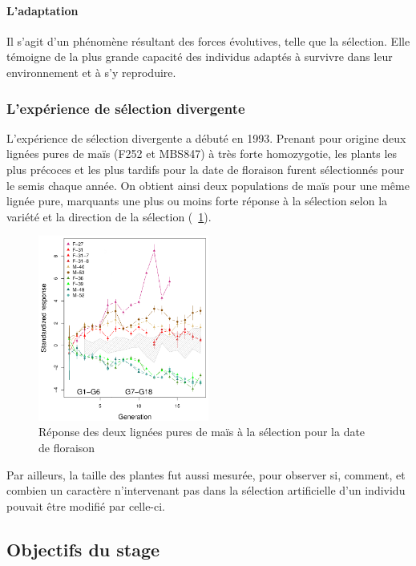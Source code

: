 \documentclass[12pt,a4paper]{article}
\begin{document}
						\paragraph{L'adaptation}
							Il s'agit d'un phénomène résultant des forces évolutives, telle que la sélection. Elle témoigne de la plus grande capacité des individus adaptés à survivre dans leur environnement et à s'y reproduire.
					
					\subsubsection{L'expérience de sélection divergente}
					
						L'expérience de sélection divergente a débuté en 1993. Prenant pour origine deux lignées pures de maïs (F252 et MBS847) à très forte homozygotie, les plants les plus précoces et les plus tardifs pour la date de floraison furent sélectionnés pour le semis chaque année. On obtient ainsi deux populations de maïs pour une même lignée pure, marquants une plus ou moins forte réponse à la sélection selon la variété et la direction de la sélection (~\ref{sélection}).
						\begin{figure}
							\centering
							\includegraphics[width =0.5\textwidth]{selection.png}
							\caption{Réponse des deux lignées pures de maïs à la sélection pour la date de floraison}
							\label{sélection}
						\end{figure}
						
						Par ailleurs, la taille des plantes fut aussi mesurée, pour observer si, comment, et combien un caractère n'intervenant pas dans la sélection artificielle d'un individu pouvait être modifié par celle-ci.
					
				\subsection{Objectifs du stage}
				
\end{document}

